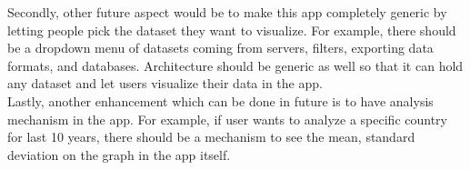 Secondly, other future aspect would be to make this app completely generic by letting people pick the dataset they want to visualize. For example, there should be a dropdown menu of datasets coming from servers, filters, exporting data formats, and databases. Architecture should be generic as well so that it can hold any dataset and let users visualize their data in the app. \\

Lastly, another enhancement which can be done in future is to have analysis mechanism in the app. For example, if user wants to analyze a specific country for last 10 years, there should be a mechanism to see the mean, standard deviation on the graph in the app itself. 
